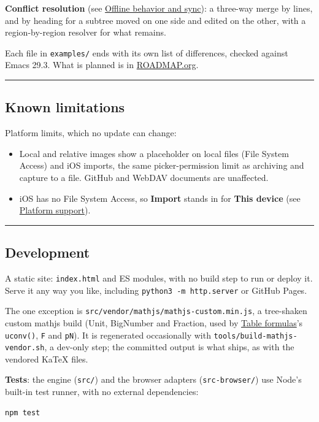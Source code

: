 \documentclass[11pt]{article}
\begin{document}
\textbf{Conflict resolution} (see \hyperref[sec:org1ff17da]{Offline behavior and sync}): a three-way merge by lines, and by heading for a subtree moved on one side and edited on the other, with a region-by-region resolver for what remains.

Each file in \texttt{examples/} ends with its own list of differences, checked against Emacs 29.3. What is planned is in \href{ROADMAP.org}{ROADMAP.org}.

\noindent\rule{\textwidth}{0.5pt}

\subsection{Known limitations}
\label{sec:orgff06c0a}
Platform limits, which no update can change:

\begin{itemize}
\item Local and relative images show a placeholder on local files (File System Access) and iOS imports, the same picker-permission limit as archiving and capture to a file. GitHub and WebDAV documents are unaffected.
\item iOS has no File System Access, so \textbf{Import} stands in for \textbf{This device} (see \hyperref[sec:orgc1b1d56]{Platform support}).
\end{itemize}

\noindent\rule{\textwidth}{0.5pt}

\subsection{Development}
\label{sec:orga70b746}
A static site: \texttt{index.html} and ES modules, with no build step to run or deploy it. Serve it any way you like, including \texttt{python3 -m http.server} or GitHub Pages.

The one exception is \texttt{src/vendor/mathjs/mathjs-custom.min.js}, a tree-shaken custom mathjs build (Unit, BigNumber and Fraction, used by \hyperref[sec:org7d24a5b]{Table formulas}'s \texttt{uconv()}, \texttt{F} and \texttt{pN}). It is regenerated occasionally with \texttt{tools/build-mathjs-vendor.sh}, a dev-only step; the committed output is what ships, as with the vendored KaTeX files.

\textbf{Tests}: the engine (\texttt{src/}) and the browser adapters (\texttt{src-browser/}) use Node's built-in test runner, with no external dependencies:

\begin{verbatim}
npm test
\end{verbatim}
\end{document}
